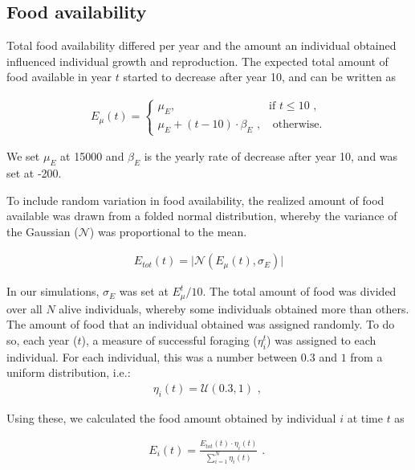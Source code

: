 \subsection{Food availability} \label{app:simul:food}
Total food availability differed per year and the amount an individual obtained influenced individual growth and reproduction. The expected total amount of food available in year $t$ started to decrease after year 10, and can be written as

\begin{align}
   E_{\mu} (t) = 
\begin{cases}
    \mu_E, & \text{if } t \leq 10 \text{ ,}\\
    \mu_E + (t-10) \cdot \beta_E \text{ ,}             & \text{ otherwise.}
\end{cases}
\end{align}

We set $\mu_E$ at 15000 and $\beta_E$ is the yearly rate of decrease after year 10, and was set at -200.

To include random variation in food availability, the realized amount of food available was drawn from a folded normal distribution, whereby the variance of the Gaussian ($\mathcal{N}$) was proportional to the mean.

\begin{align}
E_{tot} (t) = \lvert \mathcal{N}(E_{\mu}(t),\sigma_E)\rvert
\end{align}

In our simulations, $\sigma_E$ was set at $E^t_{\mu}/10$. The total amount of food was divided over all $N$ alive individuals, whereby some individuals obtained more than others. The amount of food that an individual obtained was assigned randomly. To do so, each year ($t$), a measure of successful foraging ($\eta_i^t$) was assigned to each individual. For each individual, this was a number between $0.3$ and $1$ from a uniform distribution, i.e.:
\begin{align}
\eta_i (t) = \mathcal{U}(0.3,1) \text{ , }
\end{align}

Using these, we calculated the food amount obtained by individual $i$ at time $t$ as

\begin{align}
E_i (t) = \frac{E_{tot} (t) \cdot \eta_i (t)}{ \sum_{i=1}^{N} \eta_i (t)} \text{ . }
\end{align}

\clearpage
